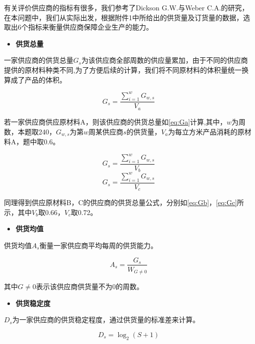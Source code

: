 \documentclass[withoutpreface,bwprint]{cumcmthesis} %
\begin{document}
有关评价供应商的指标有很多，我们参考了Dickson G.W.\cite{bib:2}与Weber C.A.的研究\cite{bib:3}，在本问题中，我们从实际出发，根据附件1中所给出的供货量及订货量的数据，选取出6个指标来衡量供应商保障企业生产的能力。

\begin{itemize}
    \item \textbf{供货总量}
\end{itemize}

一家供应商的供货总量$G_s$为该供应商全部周数的供应量累加，由于不同的供应商提供的原材料种类不同,为了方便后续的计算，我们将不同原材料的体积量统一换算成了产品的体积。

\begin{equation}
G_s=\frac{\sum_{i=1}^{w}G_{w,s}}{V_a}
\label{eq:Ga}
\end{equation}

若一家供应商供应原材料A，则该供应商的供货总量如\cref{eq:Ga}计算,其中，$w$为周数，本题取240，$G_{w,s}$为第$w$周某供应商$s$的供货量，$V_a$为每立方米产品消耗的原材料A，题中取0.6。

\begin{equation}
G_s=\frac{\sum_{i=1}^{w}G_{w,s}}{V_b}
\label{eq:Gb}
\end{equation}
\begin{equation}
G_s=\frac{\sum_{i=1}^{w}G_{w,s}}{V_c}
\label{eq:Gc}
\end{equation}

同理得到供应原材料B，C的供应商的供货总量公式，分别如\cref{eq:Gb}，\cref{eq:Gc}所示，其中$V_b$取0.66，$V_c$取0.72。

\begin{itemize}
    \item \textbf{供货均值}
\end{itemize}

供货均值$A_s$衡量一家供应商平均每周的供货能力。

\begin{equation}
A_s=\frac{G_s}{W_{G\neq0}}
\label{eq:As}
\end{equation}

其中$G\neq0$表示该供应商供货量不为0的周数。

\begin{itemize}
    \item \textbf{供货稳定度}
\end{itemize}

$D_s$为一家供应商的供货稳定程度，通过供货量的标准差来计算。

\begin{equation}
D_s=\log_2(S+1)
\label{eq:Ds}
\end{equation}
\end{document}
